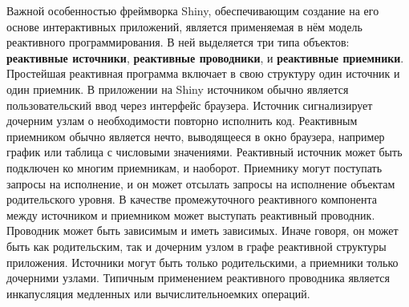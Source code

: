 Важной особенностью фреймворка Shiny, обеспечивающим создание на его основе
интерактивных приложений, является применяемая в нём модель реактивного
программирования. В ней выделяется три типа объектов: \textbf{реактивные
    источники}, \textbf{реактивные проводники}, и \textbf{реактивные приемники}.
Простейшая реактивная программа включает в свою структуру один источник и один
приемник. В приложении на Shiny источником обычно является пользовательский ввод
через интерфейс браузера.  Источник сигнализирует дочерним узлам о необходимости
повторно исполнить код. Реактивным приемником обычно является нечто, выводящееся
в окно браузера, например график или таблица с числовыми значениями.  Реактивный
источник может быть подключен ко многим приемникам, и наоборот.  Приемнику могут
поступать запросы на исполнение, и он может отсылать запросы на исполнение
объектам родительского уровня. В качестве промежуточного реактивного компонента
между источником и приемником может выступать реактивный проводник. Проводник
может быть зависимым и иметь зависимых. Иначе говоря, он может быть как
родительским, так и дочерним узлом в графе реактивной структуры приложения.
Источники могут быть только родительскими, а приемники только дочерними узлами.
Типичным применением реактивного проводника является инкапусляция медленных или
вычислительноемких операций.

